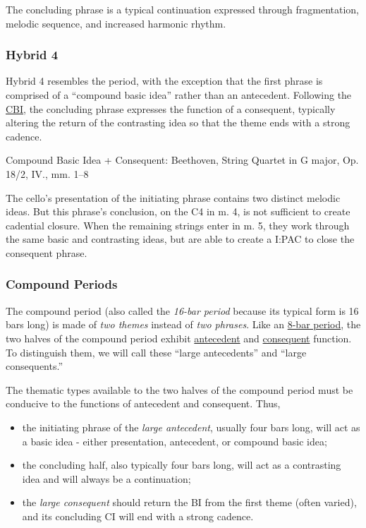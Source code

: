 \documentclass{book}
\providecommand{\tightlist}{%
  \setlength{\itemsep}{0pt}\setlength{\parskip}{0pt}}
\begin{document}
The concluding phrase is a typical continuation expressed through
fragmentation, melodic sequence, and increased harmonic rhythm.

\hypertarget{hybrid-4}{%
\subsubsection{Hybrid 4}\label{hybrid-4}}

Hybrid 4 resembles the period, with the exception that the first phrase is
comprised of a ``compound basic idea'' rather than an antecedent. Following
the \href{hybridThemes.html\#the-compound-basic-idea}{CBI}, the concluding
phrase expresses the function of a consequent, typically altering the return
of the contrasting idea so that the theme ends with a strong cadence.

Compound Basic Idea + Consequent: Beethoven, String Quartet in G major, Op.
18/2, IV., mm. 1--8

The cello's presentation of the initiating phrase contains two distinct
melodic ideas. But this phrase's conclusion, on the C4 in m. 4, is not
sufficient to create cadential closure. When the remaining strings enter in m.
5, they work through the same basic and contrasting ideas, but are able to
create a I:PAC to close the consequent phrase.

\hypertarget{compound-periods}{%
\subsubsection{Compound Periods}\label{compound-periods}}

The compound period (also called the \emph{16-bar period} because its typical
form is 16 bars long) is made of \emph{two themes} instead of \emph{two
phrases}. Like an \href{period.html}{8-bar period}, the two halves of the
compound period exhibit \href{themeFunctions.html\#antecedent}{antecedent} and
\href{themeFunctions.html\#consequent}{consequent} function. To distinguish
them, we will call these ``large antecedents'' and ``large consequents.''

The thematic types available to the two halves of the compound period must be
conducive to the functions of antecedent and consequent. Thus,

\begin{itemize}
\tightlist
\item
  the initiating phrase of the \emph{large antecedent}, usually four bars
  long, will act as a basic idea - either presentation, antecedent, or
  compound basic idea;\\
\item
  the concluding half, also typically four bars long, will act as a
  contrasting idea and will always be a continuation;\\
\item
  the \emph{large consequent} should return the BI from the first theme (often
  varied), and its concluding CI will end with a strong cadence.
\end{itemize}
\end{document}

